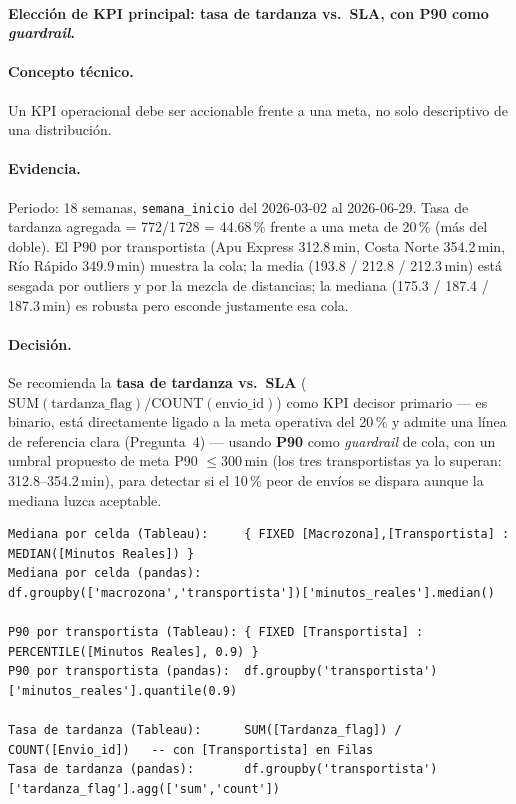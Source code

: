 \paragraph{Elección de KPI principal: tasa de tardanza vs.\ SLA, con P90 como \emph{guardrail}.}

\paragraph{Concepto técnico.} Un KPI operacional debe ser accionable frente a una meta, no solo descriptivo de una distribución.

\paragraph{Evidencia.} Periodo: 18 semanas, \lstinline|semana_inicio| del 2026-03-02 al 2026-06-29. Tasa de tardanza agregada = 772/1\,728 = 44.68\,\% frente a una meta de 20\,\% (más del doble). El P90 por transportista (Apu Express 312.8\,min, Costa Norte 354.2\,min, Río Rápido 349.9\,min) muestra la cola; la media (193.8 / 212.8 / 212.3\,min) está sesgada por outliers y por la mezcla de distancias; la mediana (175.3 / 187.4 / 187.3\,min) es robusta pero esconde justamente esa cola.

\paragraph{Decisión.} Se recomienda la \textbf{tasa de tardanza vs.\ SLA} ($\text{SUM}(\text{tardanza\_flag})/\text{COUNT}(\text{envio\_id})$) como KPI decisor primario --- es binario, está directamente ligado a la meta operativa del 20\,\% y admite una línea de referencia clara (Pregunta~4) --- usando \textbf{P90} como \emph{guardrail} de cola, con un umbral propuesto de meta P90 $\le 300$\,min (los tres transportistas ya lo superan: 312.8--354.2\,min), para detectar si el 10\,\% peor de envíos se dispara aunque la mediana luzca aceptable.

\begin{lstlisting}[style=cod]
Mediana por celda (Tableau):     { FIXED [Macrozona],[Transportista] : MEDIAN([Minutos Reales]) }
Mediana por celda (pandas):      df.groupby(['macrozona','transportista'])['minutos_reales'].median()

P90 por transportista (Tableau): { FIXED [Transportista] : PERCENTILE([Minutos Reales], 0.9) }
P90 por transportista (pandas):  df.groupby('transportista')['minutos_reales'].quantile(0.9)

Tasa de tardanza (Tableau):      SUM([Tardanza_flag]) / COUNT([Envio_id])   -- con [Transportista] en Filas
Tasa de tardanza (pandas):       df.groupby('transportista')['tardanza_flag'].agg(['sum','count'])
\end{lstlisting}

